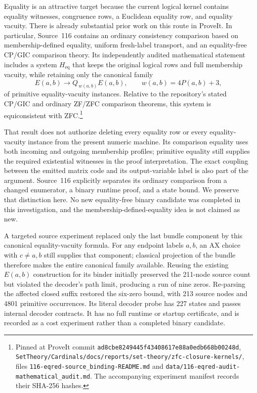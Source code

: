 Equality is an attractive target because the current logical kernel
contains equality witnesses, congruence rows, a Euclidean equality row,
and equality vacuity.  There is already substantial prior work on this
route in ProveIt.  In particular, Source~116 contains an ordinary
consistency comparison based on membership-defined equality, uniform
fresh-label transport, and an equality-free CP/GIC comparison theory.
Its independently audited mathematical statement includes a system
$H_{\mathrm{eq}}$ that keeps the original logical rows and full
membership vacuity, while retaining only the canonical family
\[
 E(a,b)\longrightarrow Q_{\,w(a,b)}E(a,b),
 \qquad w(a,b)=4P(a,b)+3,
\]
of primitive equality-vacuity instances.  Relative to the repository's
stated CP/GIC and ordinary ZF/ZFC comparison theorems, this system is
equiconsistent with ZFC.\footnote{Pinned at ProveIt commit
\texttt{ad8cbe8249445f43408617e88a0edb668b00248d},
\texttt{SetTheory/Cardinals/docs/reports/set-theory/zfc-closure-kernels/},
files \texttt{116-eqred-source\_binding-README.md} and
\texttt{data/116-eqred-audit-mathematical\_audit.md}.
The accompanying experiment manifest records their SHA-256 hashes.}

That result does not authorize deleting every equality row or every
equality-vacuity instance from the present numeric machine.  Its
comparison equality uses both incoming and outgoing membership
profiles; primitive equality still supplies the required existential
witnesses in the proof interpretation.  The exact coupling between
the emitted matrix code and its output-variable label is also part of
the argument.  Source~116 explicitly separates its ordinary comparison
from a changed enumerator, a binary runtime proof, and a state bound.
We preserve that distinction here.  No new equality-free binary
candidate was completed in this investigation, and the
membership-defined-equality idea is not claimed as new.

A targeted source experiment replaced only the last bundle component
by this canonical equality-vacuity formula.  For any endpoint labels
$a,b$, an AX choice with $c\ne a,b$ still supplies that component;
classical projection of the bundle therefore makes the entire
canonical family available.  Reusing the existing $E(a,b)$ construction
for its binder initially preserved the 211-node source count but
violated the decoder's path limit, producing a run of nine zeros.
Re-parsing the affected closed suffix restored the six-zero bound,
with 213 source nodes and 4801 primitive occurrences.  Its literal
decoder probe has 227 states and passes internal decoder contracts.
It has no full runtime or startup certificate, and is recorded as a
cost experiment rather than a completed binary candidate.

